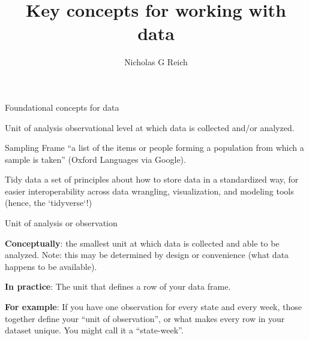 \documentclass[table]{beamer}\usepackage[]{graphicx}\usepackage[]{color}
\title{Key concepts for working with data}
\author{Nicholas G Reich}
\begin{document}
\begin{frame}[plain]
	\titlepage
\end{frame}






\begin{frame}{Foundational concepts for data}


\begin{block}{Unit of analysis}
\bi
	\myitem observational level at which data is collected and/or analyzed.
\ei
\end{block}


\begin{block}{Sampling Frame}
\bi
	\myitem ``a list of the items or people forming a population from which a sample is taken'' (Oxford Languages via Google).
\ei
\end{block}


\begin{block}{Tidy data}
\bi
	\myitem a set of principles about how to store data in a standardized way, for easier interoperability across data wrangling, visualization, and modeling tools (hence, the `tidyverse`!)
\ei
\end{block}



\end{frame}


\begin{frame}{Unit of analysis or observation}

{\bf Conceptually}: the smallest unit at which data is collected and able to be analyzed. Note: this may be determined by design or convenience (what data happens to be available).

\vspace{4em}

{\bf In practice}: The unit that defines a row of your data frame.

\vspace{4em}

{\bf For example}: If you have one observation for every state and every week, those together define your ``unit of observation'', or what makes every row in your dataset unique. You might call it a ``state-week''.
%



\end{frame}
\end{document}
